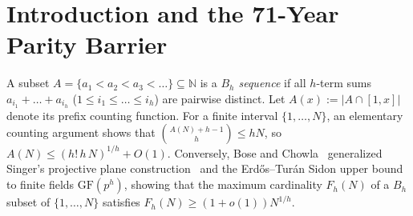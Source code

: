 \documentclass[11pt,a4paper]{article}
\theoremstyle{remark}
\begin{document}
\begin{abstract}
\[
  \liminf_{x \to \infty} \frac{A(x)}{x^{1/3}} \le c_{\infty, 3}^{\ast, \mathrm{Dio}}(K) := \left[\mathcal{K}_*\left(1 + \frac{K \ln 2}{3(1 - 4^{-K})}\right)\right]^{-1/3} \quad \forall K \ge 1,
\]
which crosses below $1.00$ at $K = 4$ ($0.964066$, or $K = 1$ at $0.956908$ with the Glaisher--Kinkelin constant) and satisfies $\lim_{K\to\infty} c_{\infty, 3}^{\ast, \mathrm{Dio}}(K) = 0$. Finally, we prove Bose--Chowla $\mathrm{GF}(p^3)$ Pigeonhole Gap Compression ($N_p^* \le p^3 - p^2$), certify all optimal $B_3$ rulers through $k = 10$ ($N = 345$, OEIS A051912) via a reversible $O(1)$ bitset-shift Rust + CUDA engine (\texttt{erdos41}, 11 bit-exact GPU kernels), and machine-check 16 core theorems in Lean~4 (\texttt{v4.33.1}, zero \texttt{sorry}s).
\end{abstract}

\section{Introduction and the 71-Year Parity Barrier}

A subset $A = \{a_1 < a_2 < a_3 < \dots\} \subseteq \mathbb{N}$ is a \emph{$B_h$ sequence} if all $h$-term sums $a_{i_1} + \dots + a_{i_h}$ ($1 \le i_1 \le \dots \le i_h$) are pairwise distinct. Let $A(x) := |A \cap [1, x]|$ denote its prefix counting function. For a finite interval $\{1, \dots, N\}$, an elementary counting argument shows that $\binom{A(N) + h - 1}{h} \le h N$, so $A(N) \le (h!\,h\,N)^{1/h} + O(1)$. Conversely, Bose and Chowla~\cite{BoseChowla1962} generalized Singer's projective plane construction~\cite{Singer1938} and the Erd\H{o}s--Tur\'an Sidon upper bound~\cite{ErdosTuran1941} to finite fields $\mathrm{GF}(p^h)$, showing that the maximum cardinality $F_h(N)$ of a $B_h$ subset of $\{1, \dots, N\}$ satisfies $F_h(N) \ge (1 + o(1)) N^{1/h}$.
\end{document}
